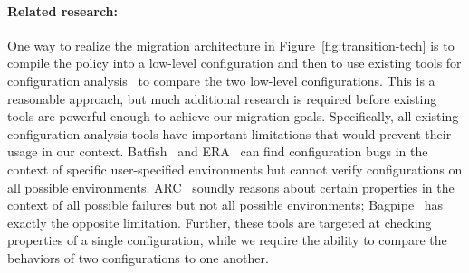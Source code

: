 
\paragraph*{Related research:}  
One way to realize the migration architecture in Figure~\ref{fig:transition-tech} is to compile the \Name policy into a low-level configuration
and then to use existing tools for configuration analysis~\cite{batfish,arc,bagpipe,era} to compare the two low-level configurations.  This is a reasonable approach, but much additional research is required before existing
tools are powerful enough to achieve our migration goals.  Specifically, all existing configuration analysis tools have important limitations that would prevent their usage in our context.  Batfish~\cite{batfish} and ERA~\cite{era} can find configuration bugs in the context of specific user-specified environments but cannot verify configurations on all possible environments.  ARC~\cite{arc} soundly reasons about certain properties in the context of all possible failures but not all possible environments; Bagpipe~\cite{bagpipe} has exactly the opposite limitation.  Further, these tools are targeted at checking properties of a single configuration, while we require the ability to compare the behaviors of two configurations to one another.

